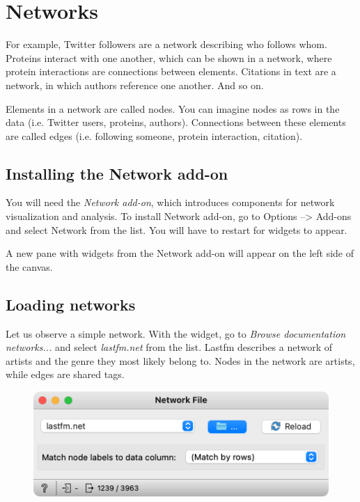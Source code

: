\chapter{Networks}

 For example, Twitter followers are a network describing who follows whom. Proteins interact with one another, which can be shown in a network, where protein interactions are connections between elements. Citations in text are a network, in which authors reference one another. And so on.

Elements in a network are called nodes. You can imagine nodes as rows in the data (i.e. Twitter users, proteins, authors). Connections between these elements are called edges (i.e. following someone, protein interaction, citation).

\section{Installing the Network add-on}

You will need the \emph{Network add-on}, which introduces components for network visualization and analysis. To install Network add-on, go to Options --> Add-ons and select Network from the list. You will have to restart \mutation for widgets to appear.

A new pane with widgets from the Network add-on will appear on the left side of the canvas.

\section{Loading networks}

Let us observe a simple network. With the  widget, go to \emph{Browse documentation networks...} and select \emph{lastfm.net} from the list. Lastfm describes a network of artists and the genre they most likely belong to. Nodes in the network are artists, while edges are shared tags.

\vspace{-0.2cm}
\begin{figure}[h]
  \centering
  \includegraphics[width=\linewidth]{network-file.png}%
  \caption{$\;$}
\end{figure}
\vspace{-0.3cm}

